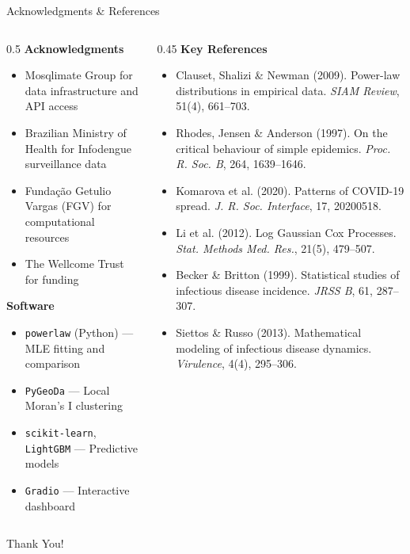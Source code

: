 \documentclass[10pt,aspectratio=169]{beamer}
\begin{document}
\begin{frame}{Acknowledgments \& References}
\begin{columns}[T]
\begin{column}{0.5\textwidth}
\textbf{Acknowledgments}
\begin{itemize}
    \item Mosqlimate Group for data infrastructure and API access
    \item Brazilian Ministry of Health for Infodengue surveillance data
    \item Fundação Getulio Vargas (FGV) for computational resources
    \item The Wellcome Trust for funding
\end{itemize}

\vspace{0.3cm}

\textbf{Software}
{\scriptsize \begin{itemize}
    \item \texttt{powerlaw} (Python) --- MLE fitting and comparison
    \item \texttt{PyGeoDa} --- Local Moran's I clustering
    \item \texttt{scikit-learn}, \texttt{LightGBM} --- Predictive models
    \item \texttt{Gradio} --- Interactive dashboard
\end{itemize}}
\end{column}

\begin{column}{0.45\textwidth}
\textbf{Key References}
{\footnotesize \begin{itemize}
    \setlength\itemsep{0.1em}
    \item Clauset, Shalizi \& Newman (2009). Power-law distributions in empirical data. \emph{SIAM Review}, 51(4), 661--703.
    \item Rhodes, Jensen \& Anderson (1997). On the critical behaviour of simple epidemics. \emph{Proc. R. Soc. B}, 264, 1639--1646.
    \item Komarova et al. (2020). Patterns of COVID-19 spread. \emph{J. R. Soc. Interface}, 17, 20200518.
    \item Li et al. (2012). Log Gaussian Cox Processes. \emph{Stat. Methods Med. Res.}, 21(5), 479--507.
    \item Becker \& Britton (1999). Statistical studies of infectious disease incidence. \emph{JRSS B}, 61, 287--307.
    \item Siettos \& Russo (2013). Mathematical modeling of infectious disease dynamics. \emph{Virulence}, 4(4), 295--306.
\end{itemize}}
\end{column}
\end{columns}
\end{frame}

\begin{frame}{Thank You!}
\begin{center}
\end{center}
\end{frame}
\end{document}
